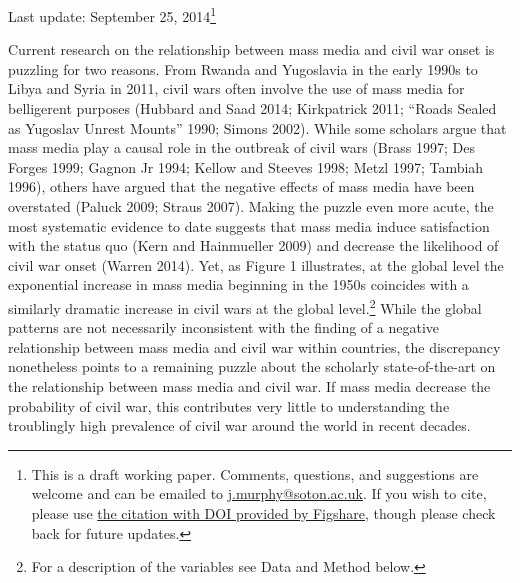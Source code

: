 \documentclass[11pt,article,oneside]{memoir}
\begin{document}
Last update: September 25, 2014\footnote{This is a draft working paper.
  Comments, questions, and suggestions are welcome and can be emailed to
  \href{mailto:j.murphy@soton.ac.uk}{j.murphy@soton.ac.uk}. If you wish
  to cite, please use
  \href{http://figshare.com/authors/Justin_Murphy/498998}{the citation
  with DOI provided by Figshare}, though please check back for future
  updates.} \newline

\clearpage
{}

\onehalfspacing

Current research on the relationship between mass media and civil war
onset is puzzling for two reasons. From Rwanda and Yugoslavia in the
early 1990s to Libya and Syria in 2011, civil wars often involve the use
of mass media for belligerent purposes (Hubbard and Saad 2014;
Kirkpatrick 2011; ``Roads Sealed as Yugoslav Unrest Mounts'' 1990;
Simons 2002). While some scholars argue that mass media play a causal
role in the outbreak of civil wars (Brass 1997; Des Forges 1999; Gagnon
Jr 1994; Kellow and Steeves 1998; Metzl 1997; Tambiah 1996), others have
argued that the negative effects of mass media have been overstated
(Paluck 2009; Straus 2007). Making the puzzle even more acute, the most
systematic evidence to date suggests that mass media induce satisfaction
with the status quo (Kern and Hainmueller 2009) and decrease the
likelihood of civil war onset (Warren 2014). Yet, as Figure 1
illustrates, at the global level the exponential increase in mass media
beginning in the 1950s coincides with a similarly dramatic increase in
civil wars at the global level.\footnote{For a description of the
  variables see Data and Method below.} While the global patterns are
not necessarily inconsistent with the finding of a negative relationship
between mass media and civil war within countries, the discrepancy
nonetheless points to a remaining puzzle about the scholarly
state-of-the-art on the relationship between mass media and civil war.
If mass media decrease the probability of civil war, this contributes
very little to understanding the troublingly high prevalence of civil
war around the world in recent decades.
\end{document}
